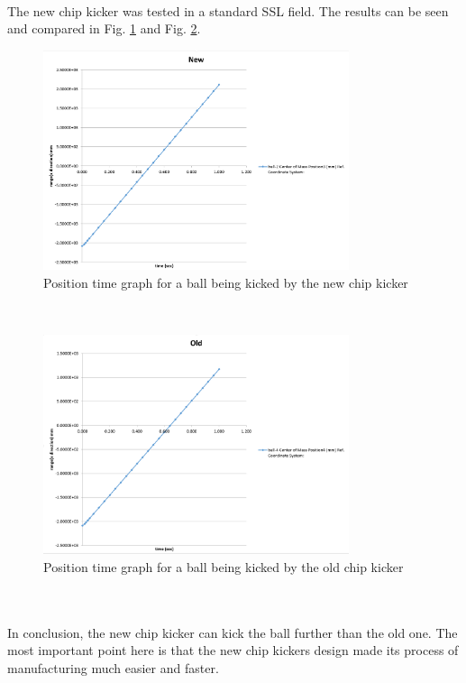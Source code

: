 \\
The new chip kicker was tested in a standard SSL field. The results can be seen and compared in Fig. \ref{fig:NEWPLOTBALL} and Fig. \ref{fig:OLDPLOTBALL}.\\
\begin{figure}
	\centering
	\includegraphics[width=0.8\textwidth]{images/NewBallPlot.png}
	\caption{Position time graph for a ball being kicked by the new chip kicker}
	\label{fig:NEWPLOTBALL}
\end{figure}\\
\begin{figure}
	\centering
	\includegraphics[width=0.8\textwidth]{images/OldBallPlot.png}
	\caption{Position time graph for a ball being kicked by the old chip kicker}
	\label{fig:OLDPLOTBALL}
\end{figure}\\
\\
In conclusion, the new chip kicker can kick the ball further than the old one. The most important point here is that the new chip kickers design made its process of manufacturing much easier and faster. %



